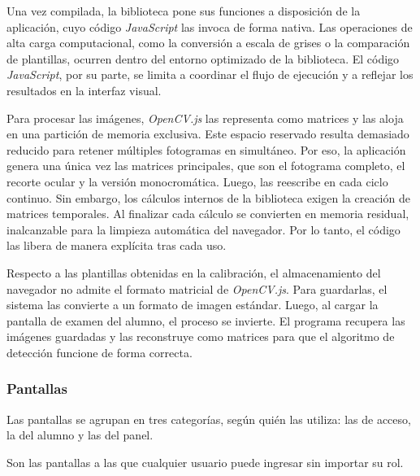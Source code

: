

Una vez compilada, la biblioteca pone sus funciones a disposición de la aplicación, cuyo código \emph{JavaScript} las invoca de forma nativa. Las operaciones de alta carga computacional, como la conversión a escala de grises o la comparación de plantillas, ocurren dentro del entorno optimizado de la biblioteca. El código \emph{JavaScript}, por su parte, se limita a coordinar el flujo de ejecución y a reflejar los resultados en la interfaz visual.

Para procesar las imágenes, \emph{OpenCV.js} las representa como matrices y las aloja en una partición de memoria exclusiva. Este espacio reservado resulta demasiado reducido para retener múltiples fotogramas en simultáneo. Por eso, la aplicación genera una única vez las matrices principales, que son el fotograma completo, el recorte ocular y la versión monocromática. Luego, las reescribe en cada ciclo continuo. Sin embargo, los cálculos internos de la biblioteca exigen la creación de matrices temporales. Al finalizar cada cálculo se convierten en memoria residual, inalcanzable para la limpieza automática del navegador. Por lo tanto, el código las libera de manera explícita tras cada uso.

Respecto a las plantillas obtenidas en la calibración, el almacenamiento del navegador no admite el formato matricial de \emph{OpenCV.js}. Para guardarlas, el sistema las convierte a un formato de imagen estándar. Luego, al cargar la pantalla de examen del alumno, el proceso se invierte. El programa recupera las imágenes guardadas y las reconstruye como matrices para que el algoritmo de detección funcione de forma correcta.

\subsubsection{Pantallas}

Las pantallas se agrupan en tres categorías, según quién las utiliza: las de acceso, la del alumno y las del panel.


Son las pantallas a las que cualquier usuario puede ingresar sin importar su rol.

